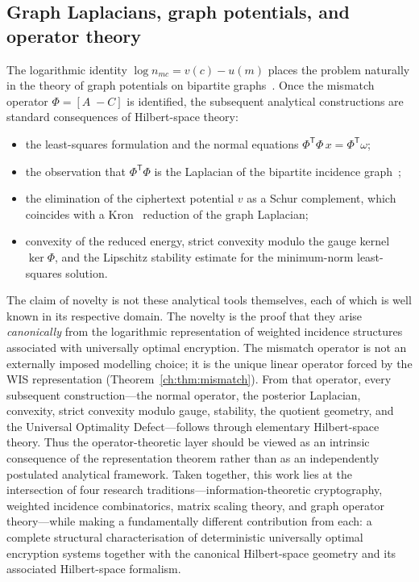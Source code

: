 \subsection*{Graph Laplacians, graph potentials, and operator theory}\label{ch:sec:graph-laplacians-graph-potentials-and-operator-theory}
The logarithmic identity $\log n_{mc}=v(c)-u(m)$ places the problem
naturally in the theory of graph potentials on bipartite
graphs~\cite{bollobas1998modern,zaslavsky1998signed}.  Once the mismatch
operator $\Phi=[A\;-C]$ is identified, the subsequent analytical
constructions are standard consequences of Hilbert-space theory:
\begin{itemize}
\item the least-squares formulation and the normal equations
      $\Phi^{\mathsf T}\Phi\,x=\Phi^{\mathsf T}\omega$;
\item the observation that $\Phi^{\mathsf T}\Phi$ is the Laplacian
      of the bipartite incidence graph~\cite{chung1997spectral};
\item the elimination of the ciphertext potential $v$ as a Schur
      complement, which coincides with a
      Kron~\cite{kron1939tensor} reduction of the graph Laplacian;
\item convexity of the reduced energy, strict convexity modulo the
      gauge kernel $\ker\Phi$, and the Lipschitz stability estimate
      for the minimum-norm least-squares solution.
\end{itemize}
The claim of novelty is not these analytical tools themselves, each
of which is well known in its respective domain.  The novelty is the
proof that they arise \emph{canonically} from the logarithmic
representation of weighted incidence structures associated with
universally optimal encryption.  The mismatch operator is not an
externally imposed modelling choice; it is the unique linear operator
forced by the WIS representation (Theorem~\ref{ch:thm:mismatch}).  From
that operator, every subsequent construction---the normal operator,
the posterior Laplacian, convexity, strict convexity modulo gauge,
stability, the quotient geometry, and the Universal Optimality
Defect---follows through elementary Hilbert-space theory.  Thus the
operator-theoretic layer should be viewed as an intrinsic consequence
of the representation theorem rather than as an independently
postulated analytical framework.
Taken together, this work lies at the intersection of four research
traditions---information-theoretic cryptography, weighted incidence
combinatorics, matrix scaling theory, and graph operator theory---while
making a fundamentally different contribution from each: a complete
structural characterisation of deterministic universally optimal
encryption systems together with the canonical Hilbert-space geometry
and its associated Hilbert-space formalism.
